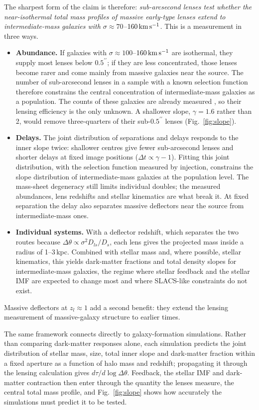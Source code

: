 \documentclass[11pt,a4paper]{article}
\newcommand{\arcsecond}{^{\prime\prime}}
\newcommand{\kms}{\,{\rm km\,s^{-1}}}
\begin{document}
The sharpest form of the claim is therefore: \emph{sub-arcsecond lenses test whether the near-isothermal total mass profiles of massive early-type lenses extend to intermediate-mass galaxies with $\sigma\approx70$--$160\kms$.} This is a measurement in three ways.
\begin{itemize}
\item \textbf{Abundance.} If galaxies with $\sigma\approx100$--$160\kms$ are isothermal, they supply most lenses below $0.5\arcsecond$; if they are less concentrated, those lenses become rarer and come mainly from massive galaxies near the source. The number of sub-arcsecond lenses in a sample with a known selection function therefore constrains the central concentration of intermediate-mass galaxies as a population. The counts of these galaxies are already measured \citep{Choi2007}, so their lensing efficiency is the only unknown. A shallower slope, $\gamma=1.6$ rather than 2, would remove three-quarters of their sub-$0.5\arcsecond$ lenses (Fig.~\ref{fig:slope}).
\item \textbf{Delays.} The joint distribution of separations and delays responds to the inner slope twice: shallower centres give fewer sub-arcsecond lenses and shorter delays at fixed image positions ($\Delta t\propto\gamma-1$). Fitting this joint distribution, with the selection function measured by injection, constrains the slope distribution of intermediate-mass galaxies at the population level. The mass-sheet degeneracy still limits individual doubles; the measured abundances, lens redshifts and stellar kinematics are what break it. At fixed separation the delay also separates massive deflectors near the source from intermediate-mass ones.
\item \textbf{Individual systems.} With a deflector redshift, which separates the two routes because $\Delta\theta\propto\sigma^2D_{ls}/D_s$, each lens gives the projected mass inside a radius of 1--3\,kpc. Combined with stellar mass and, where possible, stellar kinematics, this yields dark-matter fractions and total density slopes for intermediate-mass galaxies, the regime where stellar feedback and the stellar IMF are expected to change most and where SLACS-like constraints do not exist.
\end{itemize}
Massive deflectors at $z_l\approx1$ add a second benefit: they extend the lensing measurement of massive-galaxy structure to earlier times.

The same framework connects directly to galaxy-formation simulations. Rather than comparing dark-matter responses alone, each simulation predicts the joint distribution of stellar mass, size, total inner slope and dark-matter fraction within a fixed aperture as a function of halo mass and redshift; propagating it through the lensing calculation gives $d\tau/d\log\Delta\theta$. Feedback, the stellar IMF and dark-matter contraction then enter through the quantity the lenses measure, the central total mass profile, and Fig.~\ref{fig:slope} shows how accurately the simulations must predict it to be tested.
\end{document}
